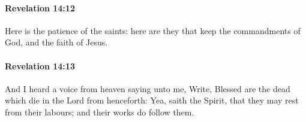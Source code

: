		\paragraph{Revelation 14:12} %
			\label{REVELATIONNT-14-12}

			Here is the patience of the saints: here are they that keep the commandments of God, and the faith of Jesus.

			\begin{framed}
			\scriptsize
				\begin{compactdesc}
					\item[SBLG] 
				\end{compactdesc}
			\end{framed}

		\paragraph{Revelation 14:13} %
			\label{REVELATIONNT-14-13}

			And I heard a voice from heaven saying unto me, Write, Blessed are the dead which die in the Lord from henceforth: Yea, saith the Spirit, that they may rest from their labours; and their works do follow them.

